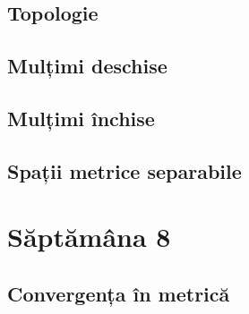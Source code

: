\documentclass[a4paper,12pt]{article}
\theoremstyle{change}
\begin{document}

\subsection{Topologie}

\subsection{Mulțimi deschise}

\subsection{Mulțimi închise}

\subsection{Spații metrice separabile}

\section{Săptămâna 8}


\subsection{Convergența în metrică}

\end{document}
